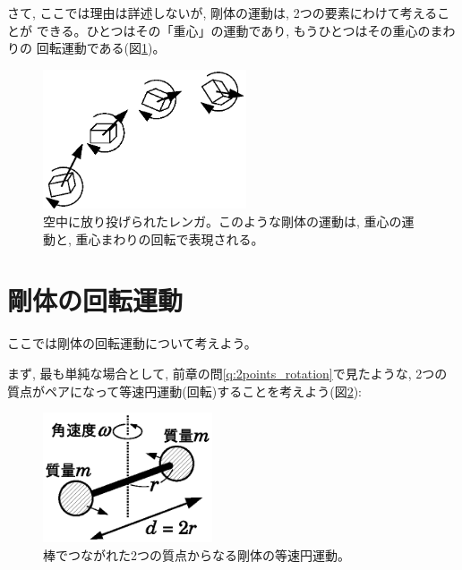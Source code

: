 さて, ここでは理由は詳述しないが, 剛体の運動は, 2つの要素にわけて考えることが
できる。ひとつはその「重心」の運動であり, もうひとつはその重心のまわりの
回転運動である(図\ref{fig:rigid_motion})。

\begin{figure}[h]
    \centering
    \includegraphics[width=6.0cm]{rigid_motion.eps}
    \caption{空中に放り投げられたレンガ。このような剛体の運動は, 重心の運動と, 重心まわりの回転で表現される。}\label{fig:rigid_motion}
\end{figure}
\hv

\section{剛体の回転運動}

ここでは剛体の回転運動について考えよう。

まず, 最も単純な場合として, 前章の問\ref{q:2points_rotation}で見たような, 
2つの質点がペアになって等速円運動(回転)することを考えよう(図\ref{fig:angular_mom_2balls}):
\begin{figure}[h]
    \centering
    \includegraphics[width=5.0cm]{angular_mom_2balls.eps}
    \caption{棒でつながれた2つの質点からなる剛体の等速円運動。}\label{fig:angular_mom_2balls}
\end{figure}


